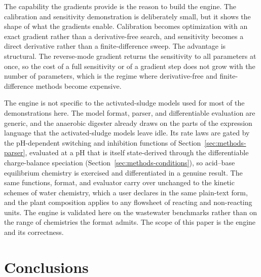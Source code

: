 \documentclass{article}
\begin{document}
The capability the gradients provide is the reason to build the engine. The calibration and sensitivity demonstration is deliberately small, but it shows the shape of what the gradients enable. Calibration becomes optimization with an exact gradient rather than a derivative-free search, and sensitivity becomes a direct derivative rather than a finite-difference sweep. The advantage is structural. The reverse-mode gradient returns the sensitivity to all parameters at once, so the cost of a full sensitivity or of a gradient step does not grow with the number of parameters, which is the regime where derivative-free and finite-difference methods become expensive.

The engine is not specific to the activated-sludge models used for most of the demonstrations here. The model format, parser, and differentiable evaluation are generic, and the anaerobic digester already draws on the parts of the expression language that the activated-sludge models leave idle. Its rate laws are gated by the pH-dependent switching and inhibition functions of Section~\ref{sec:methods-parser}, evaluated at a pH that is itself state-derived through the differentiable charge-balance speciation (Section~\ref{sec:methods-conditions}), so acid--base equilibrium chemistry is exercised and differentiated in a genuine result. The same functions, format, and evaluator carry over unchanged to the kinetic schemes of water chemistry, which a user declares in the same plain-text form, and the plant composition applies to any flowsheet of reacting and non-reacting units. The engine is validated here on the wastewater benchmarks rather than on the range of chemistries the format admits. The scope of this paper is the engine and its correctness.

\section{Conclusions}
\label{sec:conclusions}
\end{document}
